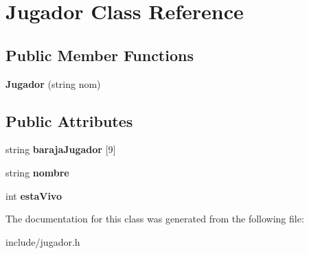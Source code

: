 \hypertarget{class_jugador}{}\section{Jugador Class Reference}
\label{class_jugador}
\subsection*{Public Member Functions}
\begin{DoxyCompactItemize}
\item 
\mbox{\label{class_jugador_a416451520449462f311e4bc397dd4b31}} 
{\bfseries Jugador} (string nom)
\end{DoxyCompactItemize}
\subsection*{Public Attributes}
\begin{DoxyCompactItemize}
\item 
\mbox{\label{class_jugador_ab45a9d5900e1f695391f7802d4ce5cfc}} 
string {\bfseries baraja\+Jugador} \mbox{[}9\mbox{]}
\item 
\mbox{\label{class_jugador_ae173555c513c4267f92c915e94c7e524}} 
string {\bfseries nombre}
\item 
\mbox{\label{class_jugador_afb8bac5a28f3c7ef4f925362a58d8a63}} 
int {\bfseries esta\+Vivo}
\end{DoxyCompactItemize}


The documentation for this class was generated from the following file\+:\begin{DoxyCompactItemize}
\item 
include/jugador.\+h\end{DoxyCompactItemize}
